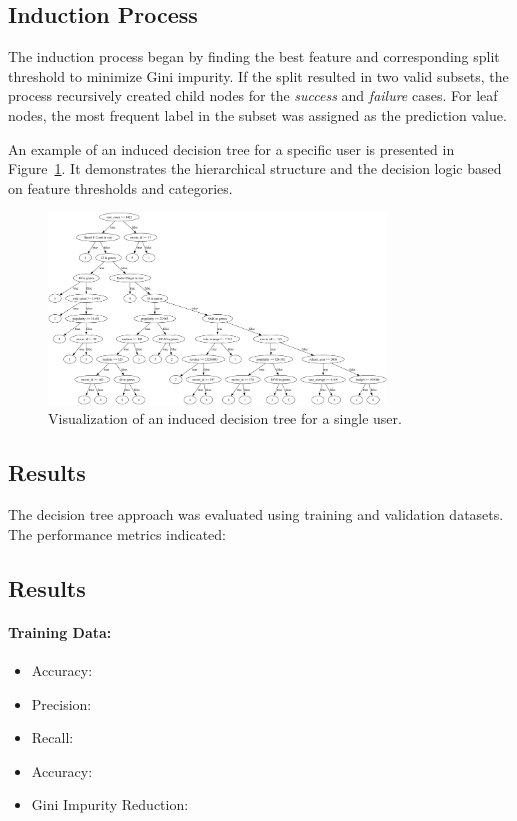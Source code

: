 \documentclass[a4paper,10pt]{article}
\begin{document}
\subsection{Induction Process}
The induction process began by finding the best feature
and corresponding split threshold to minimize Gini impurity.
If the split resulted in two valid subsets, the process
recursively created child nodes for the
\textit{success} and \textit{failure} cases.
For leaf nodes, the most frequent label in the subset was
assigned as the prediction value.

An example of an induced decision tree for a specific user
is presented in Figure~\ref{fig:decision_tree}.
It demonstrates the hierarchical structure and the
decision logic based on feature thresholds and categories.

\begin{figure}[h!]
    \centering
    \includegraphics[width=0.8\textwidth]{tree}
    \caption{Visualization of an induced decision tree for a single user.}
    \label{fig:decision_tree}
\end{figure}

\subsection{Results}
The decision tree approach was evaluated using training and
validation datasets.
The performance metrics indicated:

\subsection{Results}
\paragraph{Training Data:}
\begin{itemize}
    \item Accuracy:
    \item Precision:
    \item Recall:
    \item Accuracy:
    \item Gini Impurity Reduction:
\end{itemize}
\end{document}

